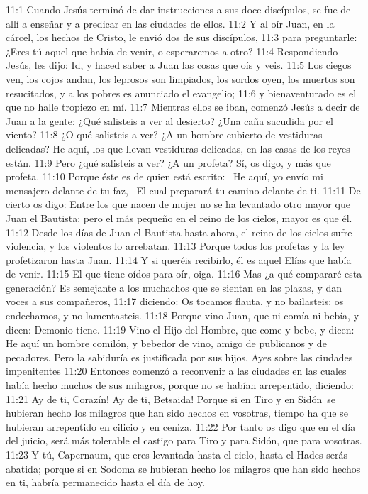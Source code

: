 11:1 Cuando Jesús terminó de dar instrucciones a sus doce discípulos, se fue de allí a enseñar y a predicar en las ciudades de ellos. 
11:2 Y al oír Juan, en la cárcel, los hechos de Cristo, le envió dos de sus discípulos, 
11:3 para preguntarle: ¿Eres tú aquel que había de venir, o esperaremos a otro? 
11:4 Respondiendo Jesús, les dijo: Id, y haced saber a Juan las cosas que oís y veis. 
11:5 Los ciegos ven, los cojos andan, los leprosos son limpiados, los sordos oyen, los muertos son resucitados, y a los pobres es anunciado el evangelio; 
11:6 y bienaventurado es el que no halle tropiezo en mí. 
11:7 Mientras ellos se iban, comenzó Jesús a decir de Juan a la gente: ¿Qué salisteis a ver al desierto? ¿Una caña sacudida por el viento? 
11:8 ¿O qué salisteis a ver? ¿A un hombre cubierto de vestiduras delicadas? He aquí, los que llevan vestiduras delicadas, en las casas de los reyes están. 
11:9 Pero ¿qué salisteis a ver? ¿A un profeta? Sí, os digo, y más que profeta. 
11:10 Porque éste es de quien está escrito: 
 He aquí, yo envío mi mensajero delante de tu faz, 
 El cual preparará tu camino delante de ti. 
11:11 De cierto os digo: Entre los que nacen de mujer no se ha levantado otro mayor que Juan el Bautista; pero el más pequeño en el reino de los cielos, mayor es que él. 
11:12 Desde los días de Juan el Bautista hasta ahora, el reino de los cielos sufre violencia, y los violentos lo arrebatan. 
11:13 Porque todos los profetas y la ley profetizaron hasta Juan. 
11:14 Y si queréis recibirlo, él es aquel Elías que había de venir. 
11:15 El que tiene oídos para oír, oiga. 
11:16 Mas ¿a qué compararé esta generación? Es semejante a los muchachos que se sientan en las plazas, y dan voces a sus compañeros, 
11:17 diciendo: Os tocamos flauta, y no bailasteis; os endechamos, y no lamentasteis. 
11:18 Porque vino Juan, que ni comía ni bebía, y dicen: Demonio tiene. 
11:19 Vino el Hijo del Hombre, que come y bebe, y dicen: He aquí un hombre comilón, y bebedor de vino, amigo de publicanos y de pecadores. Pero la sabiduría es justificada por sus hijos. 
Ayes sobre las ciudades impenitentes  
11:20 Entonces comenzó a reconvenir a las ciudades en las cuales había hecho muchos de sus milagros, porque no se habían arrepentido, diciendo: 
11:21 Ay de ti, Corazín! Ay de ti, Betsaida! Porque si en Tiro y en Sidón se hubieran hecho los milagros que han sido hechos en vosotras, tiempo ha que se hubieran arrepentido en cilicio y en ceniza. 
11:22 Por tanto os digo que en el día del juicio, será más tolerable el castigo para Tiro y para Sidón, que para vosotras. 
11:23 Y tú, Capernaum, que eres levantada hasta el cielo, hasta el Hades serás abatida; porque si en Sodoma se hubieran hecho los milagros que han sido hechos en ti, habría permanecido hasta el día de hoy. 
